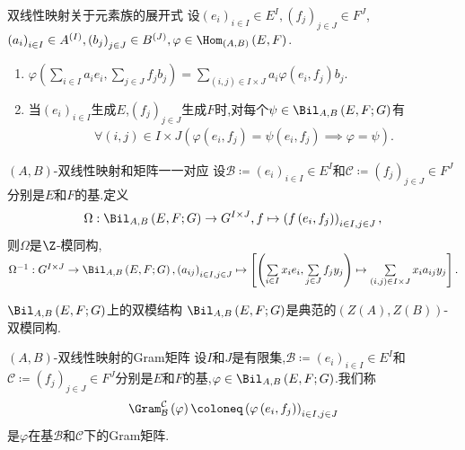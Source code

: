 \begin{proposition}{双线性映射关于元素族的展开式}{}
	设$\left(e_{i}\right)_{i\in I}\in E^{I},\left(f_{j}\right)_{j\in J}\in F^{J}$,$\left(a_{i}\right)_{i\in I}\in A^{\left(I\right)},\left(b_{j}\right)_{j\in J}\in B^{\left(J\right)},\varphi\in\Hom_{\left(A,B\right)}\left(E,F\right)$.
	\begin{enumerate}
		\item $\varphi\left(\sum\limits_{i\in I}a_{i}e_{i},\sum\limits_{j\in J}f_{j}b_{j}\right)=\sum\limits_{\left(i,j\right)\in I\times J}a_{i}\varphi\left(e_{i},f_{j}\right)b_{j}$.
		\item 当$\left(e_{i}\right)_{i\in I}$生成$E$,$\left(f_{j}\right)_{j\in J}$生成$F$时,对每个$\psi\in\Bil_{A,B}\left(E,F;G\right)$有
		\begin{align*}
			\forall\left(i,j\right)\in I\times J\left(\varphi\left(e_{i},f_{j}\right)=\psi\left(e_{i},f_{j}\right)\implies\varphi=\psi\right).
		\end{align*}
	\end{enumerate}
\end{proposition}

\begin{proposition}{$\left(A,B\right)$-双线性映射和矩阵一一对应}{}
	设$\mathcal{B}\coloneq\left(e_{i}\right)_{i\in I}\in E^{I}$和$\mathcal{C}\coloneq\left(f_{j}\right)_{j\in J}\in F^{J}$分别是$E$和$F$的基.定义
	\begin{align*}
		\Omega:\Bil_{A,B}\left(E,F;G\right)\to G^{I\times J},f\mapsto\left(f\left(e_{i},f_{j}\right)\right)_{i\in I,j\in J},
	\end{align*}
	则$\Omega$是$\Z$-模同构,$\Omega^{-1}:G^{I\times J}\to\Bil_{A,B}\left(E,F;G\right),\left(a_{ij}\right)_{i\in I,j\in J}\mapsto\left[\left(\sum\limits_{i\in I}x_{i}e_{i},\sum\limits_{j\in J}f_{j}y_{j}\right)\mapsto\sum\limits_{\left(i,j\right)\in I\times J}x_{i}a_{ij}y_{j}\right].$
\end{proposition}

\begin{proposition}{$\Bil_{A,B}\left(E,F;G\right)$上的双模结构}{}
	$\Bil_{A,B}\left(E,F;G\right)$是典范的$\left(Z\left(A\right),Z\left(B\right)\right)$-双模同构.
\end{proposition}

\begin{definition}{$\left(A,B\right)$-双线性映射的Gram矩阵}{}
	设$I$和$J$是有限集,$\mathcal{B}\coloneq\left(e_{i}\right)_{i\in I}\in E^{I}$和$\mathcal{C}\coloneq\left(f_{j}\right)_{j\in J}\in F^{J}$分别是$E$和$F$的基,$\varphi\in\Bil_{A,B}\left(E,F;G\right)$.我们称
	\begin{align*}
		\Gram_{\mathcal{B}}^{\mathcal{C}}\left(\varphi\right)\coloneq\left(\varphi\left(e_{i},f_{j}\right)\right)_{i\in I,j\in J}
	\end{align*}
	是$\varphi$在基$\mathcal{B}$和$\mathcal{C}$下的Gram矩阵.
\end{definition}

